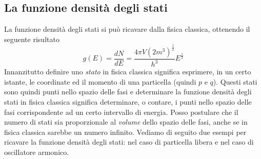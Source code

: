 \subsection{La funzione densità degli stati}
La funzione densità degli stati si può ricavare dalla fisica classica, ottenendo il seguente risultato
\begin{equation} 
g(E) = \frac{dN}{dE} = \frac{4 \pi V (2m^3)^{ \frac{1}{2} }}{h^3} E^{ \frac{1}{2} }
\label{dens_stati}
\end{equation}
Innanzitutto definire uno \textit{stato} in fisica classica significa esprimere, in un certo istante, le coordinate ed il momento di una particella (quindi $p$ e $q$). 
Questi stati sono quindi punti nello spazio delle fasi e determinare la funzione densità degli stati in fisica classica significa determinare, o contare, i punti nello spazio delle fasi corrispondente ad un certo intervallo di energia.
Posso postulare che il numero di stati sia proporzionale al \textit{volume} dello spazio delle fasi, anche se in fisica classica sarebbe un numero infinito.
Vediamo di seguito due esempi per ricavare la funzione densità degli stati: nel caso di particella libera e nel caso di oscillatore armonico.


